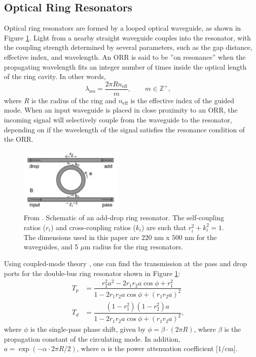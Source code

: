 \documentclass[letterpaper, 10 pt, conference]{ieeeconf}
\begin{document}
\subsection*{Optical Ring Resonators}

Optical ring resonators are formed by a looped optical waveguide, as shown in Figure \ref{fig:1}. Light from a nearby straight waveguide couples into the resonator, with the coupling strength determined by several parameters, such as the gap distance, effective index, and wavelength. An ORR is said to be ''on resonance'' when the propagating wavelength fits an integer number of times inside the optical length of the ring cavity. In other words,
\begin{equation}
    \lambda_\text{res} = \frac{2\pi R n_\text{eff}}{m}, \qquad m \in \mathbb{Z}^+,
    \label{eq:lamdares}
\end{equation}
where $R$ is the radius of the ring and $n_\text{eff}$ is the effective index of the guided mode. When an input waveguide is placed in close proximity to an ORR, the incoming signal will selectively couple from the waveguide to the resonator, depending on if the wavelength of the signal satisfies the resonance condition of the ORR.

\begin{figure}[!ht]
    \centering
    \includegraphics[width = 0.45\textwidth]{add_drop_RR.png}
    \caption{From \cite{SIPORR}. Schematic of an add-drop ring resonator. The self-coupling ratios ($r_i$) and cross-coupling ratios ($k_i$) are such that $r_i^2+k_i^2=1$. The dimensions used in this paper are $220$ nm x $500$ nm for the waveguides, and 5 $\mu$m radius for the ring resonators.}
    \label{fig:1}
\end{figure} 

Using coupled-mode theory \cite{photonicdevices}, one can find the transmission at the pass and drop ports for the double-bus ring resonator shown in Figure \ref{fig:1}:
\begin{align}
    T_p &= \dfrac{r_2^2a^2-2r_1r_2a\cos\phi + r_1^2}{1-2r_1r_2a\cos\phi + (r_1r_2a)^2} \\
    T_d &= \dfrac{(1-r_1^2)(1-r_2^2)a}{1-2r_1r_2a\cos\phi + (r_1r_2a)^2},
\end{align}
where $\phi$ is the single-pass phase shift, given by $\phi = \beta \cdot (2\pi R)$, where $\beta$ is the propagation constant of the circulating mode. In addition, $a = \exp(-\alpha \cdot 2\pi R/2)$, where $\alpha$ is the power attenuation coefficient $[1/$cm$]$.
\end{document}
